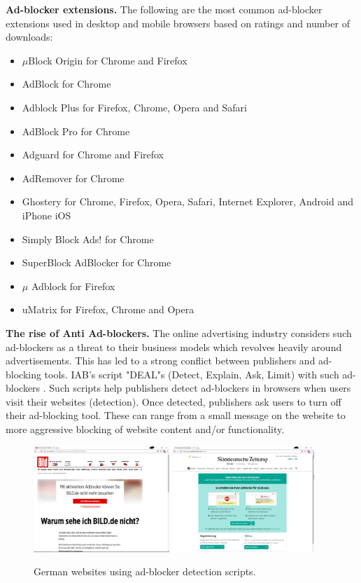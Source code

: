 \documentclass[runningheads,a4paper]{llncs}
\begin{document}
\textbf{Ad-blocker extensions.} The following are the most common ad-blocker extensions used in desktop and mobile browsers based on ratings and number of downloads:
\begin{itemize}
\item $\mu$Block Origin for Chrome and Firefox
\item AdBlock for Chrome
\item Adblock Plus for Firefox, Chrome, Opera and Safari
\item AdBlock Pro for Chrome
\item Adguard for Chrome and Firefox
\item AdRemover for Chrome
\item Ghostery for Chrome, Firefox, Opera, Safari, Internet Explorer, Android and iPhone iOS
\item Simply Block Ads! for Chrome
\item SuperBlock AdBlocker for Chrome
\item $\mu$ Adblock for Firefox
\item uMatrix for Firefox, Chrome and Opera
\end{itemize}

\textbf{The rise of Anti Ad-blockers.} The online advertising industry considers such ad-blockers as a threat to their business models which revolves heavily around advertisements. This has led to a strong conflict between publishers and ad-blocking tools. IAB's script "DEAL"s (Detect, Explain, Ask, Limit) with such ad-blockers \cite{IAB2017}. Such scripts help publishers detect ad-blockers in browsers when users visit their websites (detection). Once detected, publishers ask
users to turn off their ad-blocking tool. These can range from a small message on the website to more aggressive blocking of website content and/or functionality. 

\begin{figure}
\centering
\includegraphics[height=4.0cm]{bildde}
\includegraphics[height=4.0cm]{suedzeit}
\caption{German websites using ad-blocker detection scripts.}
\label{fig:germanBlocks}
\end{figure}
\end{document}
